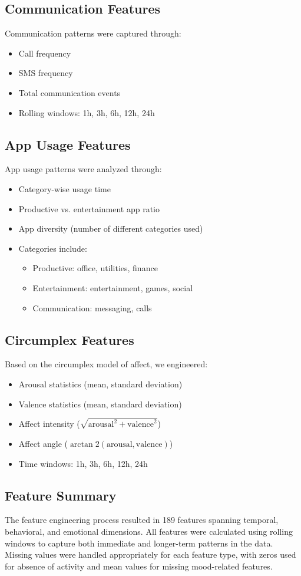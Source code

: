 \subsection{Communication Features}
Communication patterns were captured through:
\begin{itemize}
    \item Call frequency
    \item SMS frequency
    \item Total communication events
    \item Rolling windows: 1h, 3h, 6h, 12h, 24h
\end{itemize}

\subsection{App Usage Features}
App usage patterns were analyzed through:
\begin{itemize}
    \item Category-wise usage time
    \item Productive vs. entertainment app ratio
    \item App diversity (number of different categories used)
    \item Categories include:
    \begin{itemize}
        \item Productive: office, utilities, finance
        \item Entertainment: entertainment, games, social
        \item Communication: messaging, calls
    \end{itemize}
\end{itemize}

\subsection{Circumplex Features}
Based on the circumplex model of affect, we engineered:
\begin{itemize}
    \item Arousal statistics (mean, standard deviation)
    \item Valence statistics (mean, standard deviation)
    \item Affect intensity ($\sqrt{\text{arousal}^2 + \text{valence}^2}$)
    \item Affect angle ($\arctan2(\text{arousal}, \text{valence})$)
    \item Time windows: 1h, 3h, 6h, 12h, 24h
\end{itemize}

\subsection{Feature Summary}
The feature engineering process resulted in 189 features spanning temporal, behavioral, and emotional dimensions. All features were calculated using rolling windows to capture both immediate and longer-term patterns in the data. Missing values were handled appropriately for each feature type, with zeros used for absence of activity and mean values for missing mood-related features.
